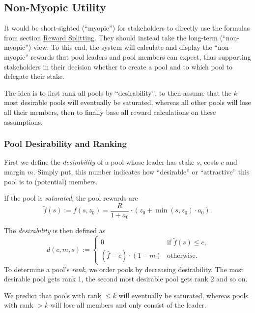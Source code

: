 \documentclass[11pt,a4paper]{article}
\begin{document}
\subsection{Non-Myopic Utility}\label{non-myopic-utility}

It would be short-sighted (``myopic'') for stakeholders to directly use
the formulas from section \hyperref[reward-splitting]{Reward Splitting}.
They should instead take the long-term (``non-myopic'') view. To this
end, the system will calculate and display the ``non-myopic'' rewards
that pool leaders and pool members can expect, thus supporting
stakeholders in their decision whether to create a pool and to which
pool to delegate their stake.

The idea is to first rank all pools by ``desirability'', to then assume
that the \(k\) most desirable pools will eventually be saturated,
whereas all other pools will lose all their members, then to finally
base all reward calculations on these assumptions.

\subsubsection{Pool Desirability and
Ranking}\label{pool-desirability-and-ranking}

First we define the \emph{desirability} of a pool whose leader has stake
\(s\), costs \(c\) and margin \(m\). Simply put, this number indicates
how ``desirable'' or ``attractive'' this pool is to (potential) members.

If the pool is \emph{saturated}, the pool rewards are \[
    \tilde{f}(s) :=
    f(s,z_0)=
    \frac{R}{1 + a_0}
    \cdot
    \left(z_0 + \min(s,z_0)\cdot a_0\right).
\]

The \emph{desirability} is then defined as \[
    d(c, m, s) :=
    \left\{
    \begin{array}{ll}
        \displaystyle 0 &
        \text{if $\tilde{f}(s)\leq c$,} \\
        \displaystyle(\hat{f} - c)\cdot(1-m) &
        \text{otherwise.}
    \end{array}
    \right.
\] To determine a pool's \emph{rank}, we order pools by decreasing
desirability. The most desirable pool gets rank 1, the second most
desirable pool gets rank 2 and so on.

We predict that pools with rank \(\leq k\) will eventually be saturated,
whereas pools with rank \(>k\) will lose all members and only consist of
the leader.
\end{document}
